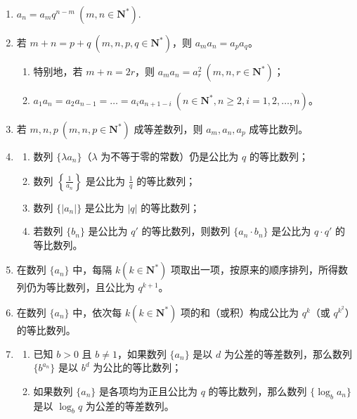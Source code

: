 \documentclass{article}
\begin{document}
\begin{enumerate}
    \item \(a_n = a_m q^{n-m}\ (m,n \in \mathbf{N}^*)\).

    \item 若 \(m+n=p+q\ (m,n,p,q \in \mathbf{N}^*)\)，则 \(a_m a_n = a_p a_q\)。
    \begin{enumerate}[label=\arabic*)]
        \item 特别地，若 \(m+n=2r\)，则 \(a_m a_n = a_r^2\ (m,n,r \in \mathbf{N}^*)\)；
        \item \(a_1 a_n = a_2 a_{n-1} = \dots = a_i a_{n+1-i}\ (n \in \mathbf{N}^*, n \geqslant 2, i = 1,2,\dots,n)\)。
    \end{enumerate}

    \item 若 \(m,n,p\ (m,n,p \in \mathbf{N}^*)\) 成等差数列，则 \(a_m,a_n,a_p\) 成等比数列。

    \item
    \begin{enumerate}[label=\arabic*)]
        \item 数列 \(\{\lambda a_n\}\)（\(\lambda\) 为不等于零的常数）仍是公比为 \(q\) 的等比数列；
        \item 数列 \(\left\{\frac{1}{a_n}\right\}\) 是公比为 \(\frac{1}{q}\) 的等比数列；
        \item 数列 \(\{|a_n|\}\) 是公比为 \(|q|\) 的等比数列；
        \item 若数列 \(\{b_n\}\) 是公比为 \(q'\) 的等比数列，则数列 \(\{a_n \cdot b_n\}\) 是公比为 \(q \cdot q'\) 的等比数列。
    \end{enumerate}

    \item 在数列 \(\{a_n\}\) 中，每隔 \(k(k \in \mathbf{N}^*)\) 项取出一项，按原来的顺序排列，所得数列仍为等比数列，且公比为 \(q^{k+1}\)。

    \item 在数列 \(\{a_n\}\) 中，依次每 \(k(k \in \mathbf{N}^*)\) 项的和（或积）构成公比为 \(q^k\)（或 \(q^{k^2}\)）的等比数列。

    \item
    \begin{enumerate}[label=\arabic*)]
        \item 已知 \(b>0\) 且 \(b \neq 1\)，如果数列 \(\{a_n\}\) 是以 \(d\) 为公差的等差数列，那么数列 \(\{b^{a_n}\}\) 是以 \(b^d\) 为公比的等比数列；
        \item 如果数列 \(\{a_n\}\) 是各项均为正且公比为 \(q\) 的等比数列，那么数列 \(\{\log_b a_n\}\) 是以 \(\log_b q\) 为公差的等差数列。
    \end{enumerate}
\end{enumerate}
\newpage
\end{document}
